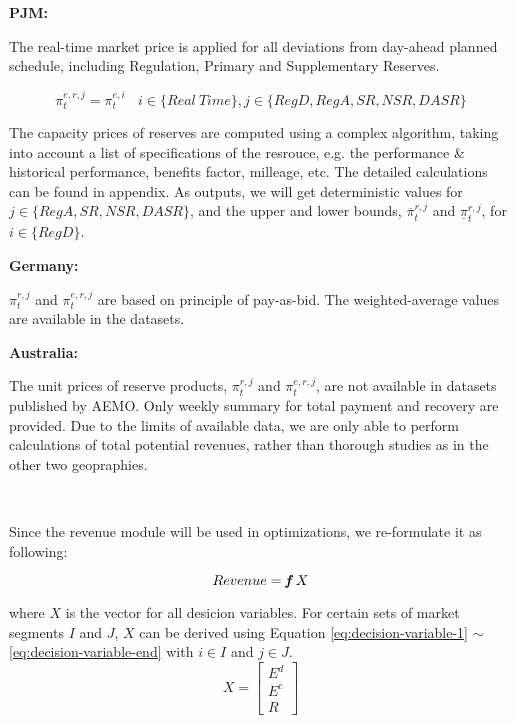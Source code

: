 \textbf{PJM:}

The real-time market price is applied for all deviations from day-ahead planned schedule, including Regulation, Primary and Supplementary Reserves.

\begin{equation*}
\pi_t^{e,r,j} = \pi_t^{e,i} ~~~~ i \in \{Real~Time\}, j \in \{RegD, RegA, SR, NSR, DASR\}
\end{equation*}

The capacity prices of reserves are computed using a complex algorithm, taking into account a list of specifications of the resrouce, e.g. the performance \& historical performance, benefits factor, milleage, etc. The detailed calculations can be found in appendix. As outputs, we will get deterministic values for $j \in \{RegA, SR, NSR, DASR\}$, and the upper and lower bounds, $\overline{\pi}_t^{r,j}$ and $\underline{\pi}_t^{r,j}$, for $i \in \{RegD\}$.

\textbf{Germany:}

$\pi_t^{r,j}$ and $\pi_t^{e,r,j}$ are based on principle of pay-as-bid. The weighted-average values are available in the datasets.

\textbf{Australia:}

The unit prices of reserve products, $\pi_t^{r,j}$ and $\pi_t^{e,r,j}$, are not available in datasets published by AEMO. Only weekly summary for total payment and recovery are provided. Due to the limits of available data, we are only able to perform calculations of total potential revenues, rather than thorough studies as in the other two geopraphies.

~\newline

Since the revenue module will be used in optimizations, we re-formulate it as following:

\begin{equation*}
Revenue = \textit{\textbf{f}}~X
\end{equation*}

where $X$ is the vector for all desicion variables. For certain sets of market segments $I$ and $J$, $X$ can be derived using Equation \eqref{eq:decision-variable-1} $\sim$ \eqref{eq:decision-variable-end} with $i \in I$ and $j \in J$.
\begin{equation}
\label{eq:decision-variable-1}
X =
\begin{bmatrix}
E^d \\ E^c \\ R
\end{bmatrix}
\end{equation}

